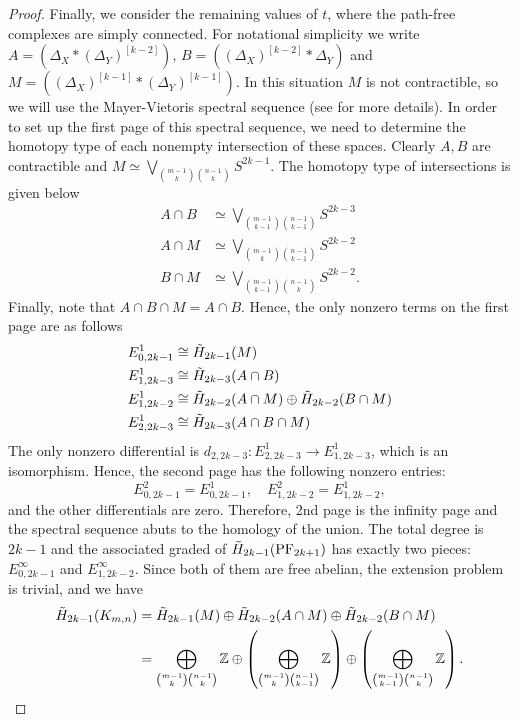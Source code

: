 \documentclass[12pt,reqno]{amsart}
\theoremstyle{definition}
\def\Z{\mathbb{Z}}
\newcommand{\PF}{{\rm PF}}
\begin{document}
\begin{proof}
Finally, we consider the remaining values of $t$, where the path-free complexes are simply connected. 
For notational simplicity we write $A = (\Delta_X * (\Delta_{Y})^{[k-2]})$, $B = ((\Delta_{X})^{[k-2]} * \Delta_Y)$ and $M = ((\Delta_{X})^{[k-1]} * (\Delta_{Y})^{[k-1]})$. In this situation $M$ is not contractible, so we will use the Mayer-Vietoris spectral sequence (see \cite[Example 14.16]{BottTu1982} for more details). 
In order to set up the first page of this spectral sequence, we need to determine the homotopy type of each nonempty intersection of these spaces. 
Clearly $A, B$ are contractible and $M\simeq \bigvee_{\binom{m-1}{k}\binom{n-1}{k}}S^{2k-1}$. The homotopy type of intersections is given below
\begin{align*}
    A\cap B &\simeq \bigvee_{\binom{m-1}{k-1}\binom{n-1}{k-1}}S^{2k-3}\\
    A\cap M &\simeq \bigvee_{\binom{m-1}{k}\binom{n-1}{k-1}}S^{2k-2}\\
    B\cap M &\simeq \bigvee_{\binom{m-1}{k-1}\binom{n-1}{k}}S^{2k-2}.
\end{align*}
Finally, note that $A\cap B\cap M = A\cap B$. 
Hence, the only nonzero terms on the first page are as follows
\begin{align*}
    E^1_{0, 2k-1} &\cong \Tilde{H}_{2k-1}(M)\\
    E^1_{1, 2k-3} &\cong \Tilde{H}_{2k-3}(A\cap B)\\
    E^1_{1, 2k-2} &\cong \Tilde{H}_{2k-2}(A\cap M)\oplus \Tilde{H}_{2k-2}(B\cap M) \\
    E^1_{2, 2k-3} &\cong \Tilde{H}_{2k-3}(A\cap B\cap M)
\end{align*}
The only nonzero differential is $d_{2, 2k-3}: E^1_{2, 2k-3}\to E^1_{1, 2k-3}$, which is an isomorphism. 
Hence, the second page has the following nonzero entries:
\[E^2_{0, 2k-1} = E^1_{0, 2k-1},\quad E^2_{1, 2k-2} = E^1_{1, 2k-2}, \] and the other differentials are zero. 
Therefore, 2nd page is the infinity page and the spectral sequence abuts to the homology of the union. 
The total degree is $2k-1$ and the associated graded of $\Tilde{H}_{2k-1}(\PF_{2k+1})$ has exactly two pieces: $E^\infty_{0, 2k-1}$ and $E^\infty_{1, 2k-2}$. 
Since both of them are free abelian, the extension problem is trivial, and we have
\begin{align*}
    \Tilde{H}_{2k-1}(K_{m,n}) &= \Tilde{H}_{2k-1}(M)\oplus\Tilde{H}_{2k-2}(A\cap M)\oplus \Tilde{H}_{2k-2}(B\cap M)\\
    &= \bigoplus_{\binom{m-1}{k}\binom{n-1}{k}} \Z \oplus \left(\bigoplus_{\binom{m-1}{k}\binom{n-1}{k-1}} \Z\right) \oplus \left(\bigoplus_{\binom{m-1}{k-1}\binom{n-1}{k}} \Z\right).
\end{align*}


\end{proof}
\end{document}
